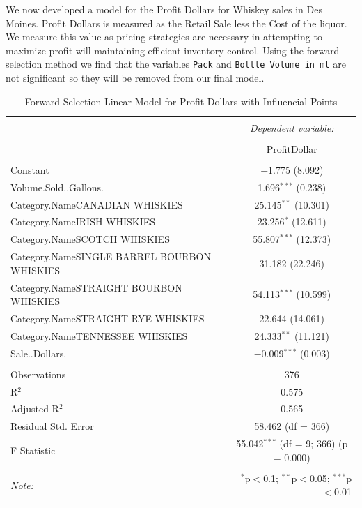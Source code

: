 \documentclass[]{elsarticle} %
\begin{document}
We now developed a model for the Profit Dollars for Whiskey sales in Des
Moines. Profit Dollars is measured as the Retail Sale less the Cost of
the liquor. We measure this value as pricing strategies are necessary in
attempting to maximize profit will maintaining efficient inventory
control. Using the forward selection method we find that the variables
\texttt{Pack} and \texttt{Bottle\ Volume\ in\ ml} are not significant so
they will be removed from our final model.

\begin{table}[!htbp] \centering 
  \caption{Forward Selection Linear Model for Profit Dollars with Influencial Points} 
  \label{} 
\normalsize 
\begin{tabular}{@{\extracolsep{5pt}}lc} 
\\[-1.8ex]\hline 
\hline \\[-1.8ex] 
 & \multicolumn{1}{c}{\textit{Dependent variable:}} \\ 
\cline{2-2} 
\\[-1.8ex] & ProfitDollar \\ 
\hline \\[-1.8ex] 
 Constant & $-$1.775 (8.092) \\ 
  Volume.Sold..Gallons. & 1.696$^{***}$ (0.238) \\ 
  Category.NameCANADIAN WHISKIES & 25.145$^{**}$ (10.301) \\ 
  Category.NameIRISH WHISKIES & 23.256$^{*}$ (12.611) \\ 
  Category.NameSCOTCH WHISKIES & 55.807$^{***}$ (12.373) \\ 
  Category.NameSINGLE BARREL BOURBON WHISKIES & 31.182 (22.246) \\ 
  Category.NameSTRAIGHT BOURBON WHISKIES & 54.113$^{***}$ (10.599) \\ 
  Category.NameSTRAIGHT RYE WHISKIES & 22.644 (14.061) \\ 
  Category.NameTENNESSEE WHISKIES & 24.333$^{**}$ (11.121) \\ 
  Sale..Dollars. & $-$0.009$^{***}$ (0.003) \\ 
 \hline \\[-1.8ex] 
Observations & 376 \\ 
R$^{2}$ & 0.575 \\ 
Adjusted R$^{2}$ & 0.565 \\ 
Residual Std. Error & 58.462 (df = 366) \\ 
F Statistic & 55.042$^{***}$ (df = 9; 366)  (p = 0.000) \\ 
\hline 
\hline \\[-1.8ex] 
\textit{Note:}  & \multicolumn{1}{r}{$^{*}$p$<$0.1; $^{**}$p$<$0.05; $^{***}$p$<$0.01} \\ 
\end{tabular} 
\end{table}
\end{document}
